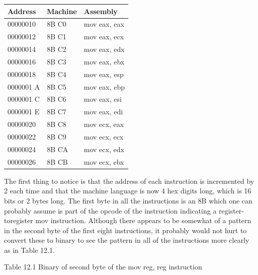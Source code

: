 \documentclass[10pt]{book}
\begin{document}
\begin{center}
\begin{tabular}{|l|l|l|}
\hline
Address & Machine & Assembly \\
\hline
00000010 & 8B C0 & mov eax, eax \\
\hline
00000012 & 8B C1 & mov eax, ecx \\
\hline
00000014 & 8B C2 & mov eax, edx \\
\hline
00000016 & 8B C3 & mov eax, ebx \\
\hline
00000018 & 8B C4 & mov eax, esp \\
\hline
0000001 A & 8B C5 & mov eax, ebp \\
\hline
0000001 C & 8B C6 & mov eax, esi \\
\hline
0000001 E & 8B C7 & mov eax, edi \\
\hline
00000020 & 8B C8 & mov ecx, eax \\
\hline
00000022 & 8B C9 & mov ecx, ecx \\
\hline
00000024 & 8B CA & mov ecx, edx \\
\hline
00000026 & 8B CB & mov ecx, ebx \\
\hline
\end{tabular}
\end{center}

The first thing to notice is that the address of each instruction is incremented by 2 each time and that the machine language is now 4 hex digits long, which is 16 bits or 2 bytes long. The first byte in all the instructions is an 8B which one can probably assume is part of the opcode of the instruction indicating a register-toregister mov instruction. Although there appears to be somewhat of a pattern in the second byte of the first eight instructions, it probably would not hurt to convert these to binary to see the pattern in all of the instructions more clearly as in Table 12.1.

Table 12.1 Binary of second byte of the mov reg, reg instruction
\end{document}
